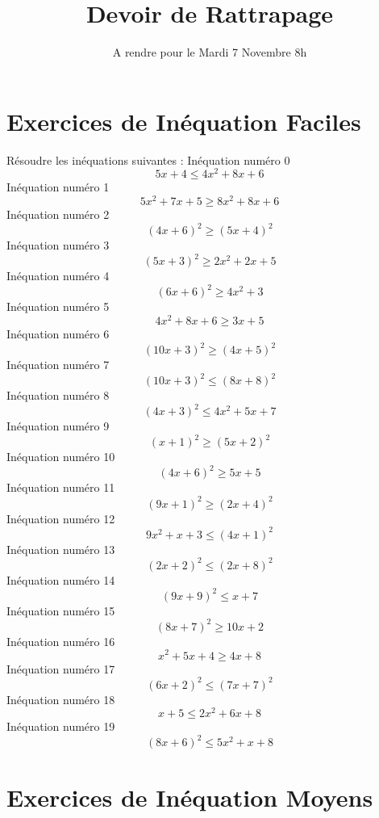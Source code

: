 \documentclass{article}
\title{Devoir de Rattrapage}
\date{A rendre pour le Mardi 7 Novembre 8h}\usepackage{natbib}
\begin{document}
\maketitle
 \section{Exercices de In\'equation Faciles}

 R\'esoudre les in\'equations suivantes : 
In\'equation num\'ero 0 \[5 x + 4 \leq 4 x^{2} + 8 x + 6\]In\'equation num\'ero 1 \[5 x^{2} + 7 x + 5 \geq 8 x^{2} + 8 x + 6\]In\'equation num\'ero 2 \[\left(4 x + 6\right)^{2} \geq \left(5 x + 4\right)^{2}\]In\'equation num\'ero 3 \[\left(5 x + 3\right)^{2} \geq 2 x^{2} + 2 x + 5\]In\'equation num\'ero 4 \[\left(6 x + 6\right)^{2} \geq 4 x^{2} + 3\]In\'equation num\'ero 5 \[4 x^{2} + 8 x + 6 \geq 3 x + 5\]In\'equation num\'ero 6 \[\left(10 x + 3\right)^{2} \geq \left(4 x + 5\right)^{2}\]In\'equation num\'ero 7 \[\left(10 x + 3\right)^{2} \leq \left(8 x + 8\right)^{2}\]In\'equation num\'ero 8 \[\left(4 x + 3\right)^{2} \leq 4 x^{2} + 5 x + 7\]In\'equation num\'ero 9 \[\left(x + 1\right)^{2} \geq \left(5 x + 2\right)^{2}\]In\'equation num\'ero 10 \[\left(4 x + 6\right)^{2} \geq 5 x + 5\]In\'equation num\'ero 11 \[\left(9 x + 1\right)^{2} \geq \left(2 x + 4\right)^{2}\]In\'equation num\'ero 12 \[9 x^{2} + x + 3 \leq \left(4 x + 1\right)^{2}\]In\'equation num\'ero 13 \[\left(2 x + 2\right)^{2} \leq \left(2 x + 8\right)^{2}\]In\'equation num\'ero 14 \[\left(9 x + 9\right)^{2} \leq x + 7\]In\'equation num\'ero 15 \[\left(8 x + 7\right)^{2} \geq 10 x + 2\]In\'equation num\'ero 16 \[x^{2} + 5 x + 4 \geq 4 x + 8\]In\'equation num\'ero 17 \[\left(6 x + 2\right)^{2} \leq \left(7 x + 7\right)^{2}\]In\'equation num\'ero 18 \[x + 5 \leq 2 x^{2} + 6 x + 8\]In\'equation num\'ero 19 \[\left(8 x + 6\right)^{2} \leq 5 x^{2} + x + 8\]
 \section{Exercices de In\'equation Moyens}
\end{document}
